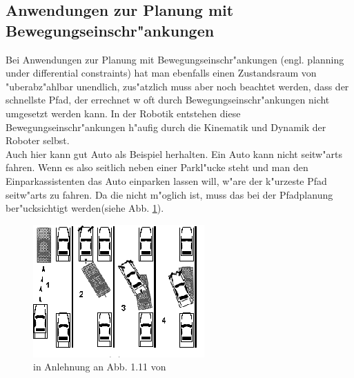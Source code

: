 \subsection{Anwendungen zur Planung mit Bewegungseinschr"ankungen}
Bei Anwendungen zur Planung mit Bewegungseinschr"ankungen (engl. planning under differential constraints) hat man ebenfalls einen Zustandsraum von "uberabz"ahlbar unendlich, zus"atzlich muss aber noch beachtet werden, dass der schnellste Pfad, der errechnet w oft durch Bewegungseinschr"ankungen nicht umgesetzt werden kann. In der Robotik entstehen diese Bewegungseinschr"ankungen h"aufig durch die Kinematik und Dynamik der Roboter selbst.\\
Auch hier kann gut Auto als Beispiel herhalten. Ein Auto kann nicht seitw"arts fahren. Wenn es also seitlich neben einer Parkl"ucke steht und man den Einparkassistenten das Auto einparken lassen will, w"are der k"urzeste Pfad seitw"arts zu fahren. Da die nicht m"oglich ist, muss das bei der Pfadplanung ber"ucksichtigt werden(siehe Abb. \ref{Abb. 5.3}).
\begin{figure}
	\centering
	\includegraphics[width=0.5\linewidth]{images/img239}
	\caption{in Anlehnung an Abb. 1.11 von \cite[~S. 15]{Lav06}}
	\label{Abb. 5.3}
\end{figure}

